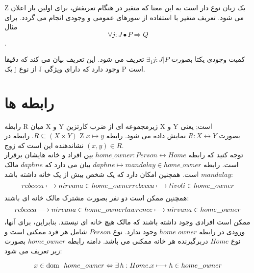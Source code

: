  Z یک زبان نوع دار است به این معنا که متغیر در هنگام تعریفش، برای اولین بار اعلان می شود. تعریف متغیر با استفاده از سورهای عمومی و وجودی انجام می گردد. برای مثال 
 \[
 \forall j:J \bullet P \Rightarrow Q
 \]
 .
 
 کمیت وجودی یکتا بصورت 
 $\exists _1 j:J|P$
 تعریف می شود. این تعریف بیان می کند که دقیقا یک j از نوع J وجود دارد که دارای ویژگی P است.   



\section{رابطه ها}
رابطه R میان X و Y زیرمجموعه ای از ضرب کارتزین X و Y است; یعنی 
$R \subseteq (X \times Y)$.
رابطه در Z بصورت
$R: X \longleftrightarrow Y$
نمایش داده می شود. رابطه  
$ x \mapsto y$
نشاندهنده این است که زوج 
$ (x,y) \in R$.
\\
توجه کنید که رابطه 
$ home\_owner : Person \longleftrightarrow Home $
بین افراد و خانه هایشان برقرار است. رابطه 
$ daphne \longmapsto mandalay \in home\_owner $
بیان می دارد که $daphne$ مالک $mandalay$ است. همچنین امکان دارد که یک شخص بیش از یک خانه داشته باشد:
\[
rebecca \longmapsto nirvana \in home\_owner
\\
rebecca \longmapsto tivoli \in home\_owner
\]
همچنین ممکن است دو نفر بصورت مشترک مالک خانه ای باشند:
\[
rebecca \longmapsto nirvana \in home\_owner
\\
lawrence \longmapsto nirvana \in home\_owner
\] 
ممکن است افرادی وجود داشته باشند که مالک هیچ خانه ای نیستند. بنابراین، برای آنها، ورودی در رابطه $home\_owner$ وجود ندارد. نوع $Person$ شامل هر فرد ممکنی است و نوع $Home$ دربرگیرنده هر خانه ممکنی می باشد. دامنه رابطه $home\_owner$ بصورت زیر تعریف می شود:

\[
x \in  \dom \enspace  home\_owner \Leftrightarrow \exists h : Home . x \longmapsto h \in home\_owner
\]


